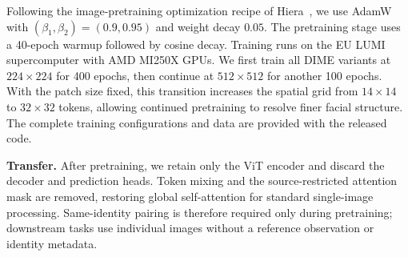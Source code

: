 \documentclass[10pt,journal,compsoc]{IEEEtran}
\begin{document}
Following the image-pretraining optimization recipe of Hiera~\cite{ryali2023hiera}, we use AdamW with $(\beta_1,\beta_2)=(0.9,0.95)$ and weight decay $0.05$. The pretraining stage uses a 40-epoch warmup followed by cosine decay. Training runs on the EU LUMI supercomputer with AMD MI250X GPUs. We first train all DIME variants at $224\times224$ for 400 epochs, then continue at $512\times512$ for another 100 epochs. With the patch size fixed, this transition increases the spatial grid from $14\times14$ to $32\times32$ tokens, allowing continued pretraining to resolve finer facial structure. The complete training configurations and data are provided with the released code.


\begin{table}[t]
\centering
\caption{\textbf{Architectures of DIME.} The decoder column reports its embedding dimension and block depth. Parameter counts exclude pretraining-only components.}
\label{tab:dime_architecture}
\setlength{\tabcolsep}{4.0pt}
\vspace{-2pt}
\vspace{-2.0em}
\end{table}

\noindent\textbf{Transfer.}
After pretraining, we retain only the ViT encoder and discard the decoder and prediction heads. Token mixing and the source-restricted attention mask are removed, restoring global self-attention for standard single-image processing. Same-identity pairing is therefore required only during pretraining; downstream tasks use individual images without a reference observation or identity metadata.
\end{document}
